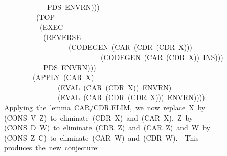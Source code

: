 \documentclass[11pt]{book}
\newenvironment{pubasis}{\begin{flushleft}\ttfamily\small}{\normalsize\rmfamily\end{flushleft}}
\begin{document}
\begin{pubasis}
~~~~~~~~~~~~~~~~PDS~ENVRN)))\\
~~~~~~~~~~~~~(TOP\\
~~~~~~~~~~~~~~(EXEC\\
~~~~~~~~~~~~~~~(REVERSE\\
~~~~~~~~~~~~~~~~~~~~~~(CODEGEN~(CAR~(CDR~(CDR~X)))\\
~~~~~~~~~~~~~~~~~~~~~~~~~~~~~~~(CODEGEN~(CAR~(CDR~X))~INS)))\\
~~~~~~~~~~~~~~~PDS~ENVRN)))\\
~~~~~~~~~~~~(APPLY~(CAR~X)\\
~~~~~~~~~~~~~~~~~~~(EVAL~(CAR~(CDR~X))~ENVRN)\\
~~~~~~~~~~~~~~~~~~~(EVAL~(CAR~(CDR~(CDR~X)))~ENVRN)))).\\

~~~~Applying~the~lemma~CAR/CDR.ELIM,~we~now~replace~X~by\\
~~~~(CONS~V~Z)~to~eliminate~(CDR~X)~and~(CAR~X),~Z~by\\
~~~~(CONS~D~W)~to~eliminate~(CDR~Z)~and~(CAR~Z)~and~W~by\\
~~~~(CONS~Z~C)~to~eliminate~(CAR~W)~and~(CDR~W).~~This\\
~~~~produces~the~new~conjecture:\\


\end{pubasis}
\end{document}
